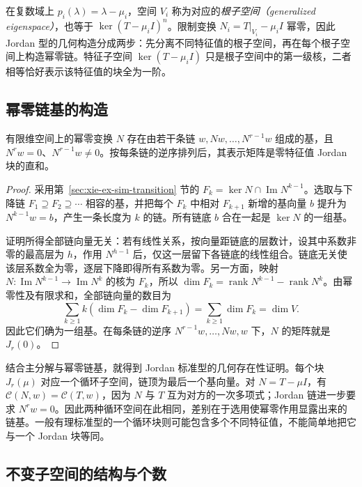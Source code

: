 在复数域上 $p_i(\lambda)=\lambda-\mu_i$，空间 $V_i$ 称为对应的\emph{根子空间（generalized eigenspace）}，也等于 $\ker(T-\mu_iI)^n$。限制变换 $N_i=T|_{V_i}-\mu_iI$ 幂零，因此 Jordan 型的几何构造分成两步：先分离不同特征值的根子空间，再在每个根子空间上构造幂零链。特征子空间 $\ker(T-\mu_iI)$ 只是根子空间中的第一级核，二者相等恰好表示该特征值的块全为一阶。

\subsection{幂零链基的构造}

\begin{proposition}
\label{prop:xie-ex-sim-nilpotent-chains}
有限维空间上的幂零变换 $N$ 存在由若干条链 $w,Nw,\ldots,N^{r-1}w$ 组成的基，且 $N^rw=0$、$N^{r-1}w\ne0$。按每条链的逆序排列后，其表示矩阵是零特征值 Jordan 块的直和。
\end{proposition}
\begin{proof}
采用第~\ref{sec:xie-ex-sim-transition} 节的 $F_k=\ker N\cap\operatorname{Im}N^{k-1}$。选取与下降链 $F_1\supseteq F_2\supseteq\cdots$ 相容的基，并把每个 $F_k$ 中相对 $F_{k+1}$ 新增的基向量 $b$ 提升为 $N^{k-1}w=b$，产生一条长度为 $k$ 的链。所有链底 $b$ 合在一起是 $\ker N$ 的一组基。

证明所得全部链向量无关：若有线性关系，按向量距链底的层数计，设其中系数非零的最高层为 $h$，作用 $N^{h-1}$ 后，仅这一层留下各链底的线性组合。链底无关使该层系数全为零，逐层下降即得所有系数为零。另一方面，映射 $N:\operatorname{Im}N^{k-1}\to\operatorname{Im}N^k$ 的核为 $F_k$，所以 $\dim F_k=\operatorname{rank}N^{k-1}-\operatorname{rank}N^k$。由幂零性及有限求和，全部链向量的数目为
\[
 \sum_{k\geq1}k(\dim F_k-\dim F_{k+1})
 =\sum_{k\geq1}\dim F_k=\dim V.
\]
因此它们确为一组基。在每条链的逆序 $N^{r-1}w,\ldots,Nw,w$ 下，$N$ 的矩阵就是 $J_r(0)$。
\end{proof}

结合主分解与幂零链基，就得到 Jordan 标准型的几何存在性证明。每个块 $J_r(\mu)$ 对应一个循环子空间，链顶为最后一个基向量。对 $N=T-\mu I$，有 $\mathcal C(N,w)=\mathcal C(T,w)$，因为 $N$ 与 $T$ 互为对方的一次多项式；Jordan 链进一步要求 $N^rw=0$。因此两种循环空间在此相同，差别在于选用使幂零作用显露出来的链基。一般有理标准型的一个循环块则可能包含多个不同特征值，不能简单地把它与一个 Jordan 块等同。

\subsection{不变子空间的结构与个数}

